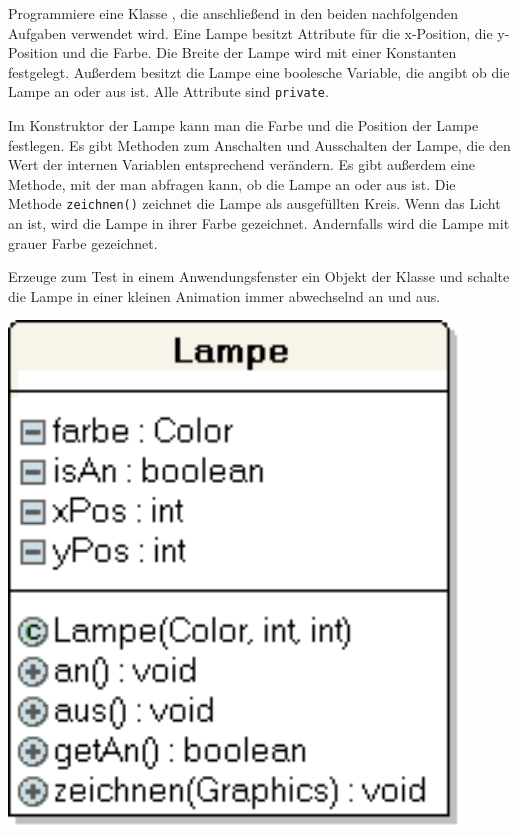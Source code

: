 \begin{minipage}{0.7\textwidth}
Programmiere eine Klasse , die anschließend in den beiden
nachfolgenden Aufgaben verwendet wird. Eine Lampe besitzt Attribute für
die x-Position, die y-Position und die Farbe. Die Breite der Lampe wird mit
einer Konstanten festgelegt. Außerdem besitzt die Lampe eine boolesche
Variable, die angibt ob die Lampe an oder aus ist. Alle Attribute sind
\lstinline|private|.

Im Konstruktor der Lampe kann man die Farbe und die Position der Lampe
festlegen. Es gibt Methoden zum Anschalten und Ausschalten der Lampe,
die den Wert der internen Variablen entsprechend verändern. Es gibt
außerdem eine Methode, mit der man abfragen kann, ob die Lampe an oder
aus ist. Die Methode \lstinline|zeichnen()| zeichnet die Lampe als ausgefüllten
Kreis. Wenn das Licht an ist, wird die Lampe in ihrer Farbe gezeichnet.
Andernfalls wird die Lampe mit grauer Farbe gezeichnet.

Erzeuge zum Test in einem Anwendungsfenster ein Objekt der Klasse
 und schalte die Lampe in einer kleinen Animation immer
abwechselnd an und aus.
\end{minipage}
\begin{minipage}{0.3\textwidth}
\begin{center}
\includegraphics[width=0.9\textwidth]{./inf/SEKII/12_Java_Datenkapselung/lampeUML.png}
\end{center}
\end{minipage}


